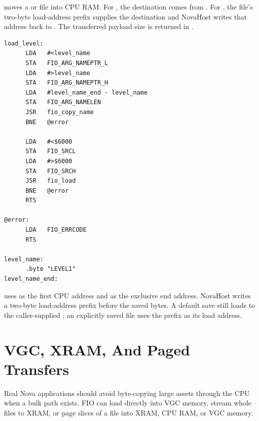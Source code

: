  moves a  or  file into CPU
RAM. For , the destination comes from .
For , the file's two-byte load-address prefix supplies the
destination and NovaHost writes that address back to .
The transferred payload size is returned in .

\begin{lstlisting}
load_level:
      LDA   #<level_name
      STA   FIO_ARG_NAMEPTR_L
      LDA   #>level_name
      STA   FIO_ARG_NAMEPTR_H
      LDA   #level_name_end - level_name
      STA   FIO_ARG_NAMELEN
      JSR   fio_copy_name
      BNE   @error

      LDA   #<$6000
      STA   FIO_SRCL
      LDA   #>$6000
      STA   FIO_SRCH
      JSR   fio_load
      BNE   @error
      RTS

@error:
      LDA   FIO_ERRCODE
      RTS

level_name:
      .byte "LEVEL1"
level_name_end:
\end{lstlisting}

 uses  as the first CPU address and
 as the exclusive end address. NovaHost writes a two-byte
load-address prefix before the saved bytes. A default  save still
loads to the caller-supplied ; an explicitly saved
 file uses the prefix as its load address.

\section{VGC, XRAM, And Paged Transfers}

Real Nova applications should avoid byte-copying large assets through the CPU
when a bulk path exists. FIO can load directly into VGC memory, stream whole
files to XRAM, or page slices of a file into XRAM, CPU RAM, or VGC memory.

\begin{center}
\end{center}

